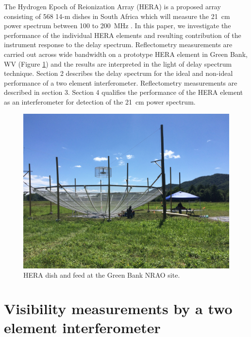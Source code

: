 \documentclass[12pt,preprint]{aastex}
\begin{document}
 The Hydrogen Epoch of Reionization Array (HERA) is a proposed array consisting of 568 14-m dishes in South Africa which will measure the 21~cm power spectrum between 100 to 200~MHz . In this paper, we investigate the performance of the individual HERA elements and resulting contribution of the instrument response to the delay spectrum. Reflectometry measurements  are carried out across wide bandwidth on a prototype HERA element in Green
Bank, WV (Figure \ref{fig:heradish}) and the results are interpreted in the light of delay spectrum technique. Section 2 describes the delay spectrum for the ideal and non-ideal performance of a two element interferometer. Reflectometry measurements are described in section 3. Section 4 qualifies the performance of the HERA element as an interferometer for detection of the 21~cm power spectrum.


\begin{figure}[ht!]
\centering
\includegraphics[trim={2cm 20cm 30cm 15cm},clip, totalheight=0.3\textheight]{plots/heradish.jpg}
\caption{HERA dish and feed at the Green Bank NRAO site.}
\label{fig:heradish}
\end{figure}

\section{Visibility measurements by a two element interferometer}
\end{document}
